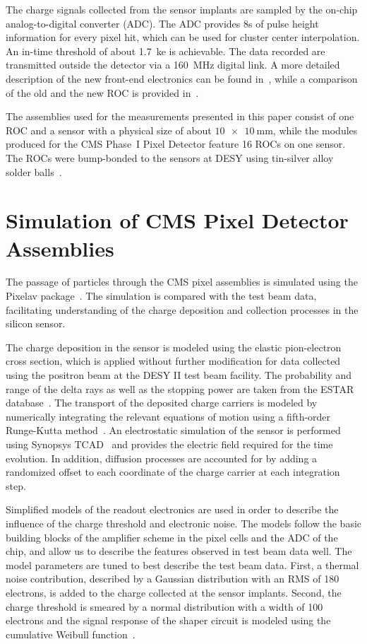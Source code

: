 \documentclass[a4paper,11pt]{article}
\begin{document}
The charge signals collected from the sensor implants are sampled by the on-chip analog-to-digital converter (ADC).
The ADC provides \SI{8}{\bit}s of pulse height information for every pixel hit, which can be used for cluster center interpolation.
An in-time threshold of about \SI{1.7}{ke} is achievable.
The data recorded are transmitted outside the detector via a \SI{160}{\MHz} digital link.
A more detailed description of the new front-end electronics can be found in~\cite{Kästli201388}, while a comparison of the old and the new ROC is provided in~\cite{upgrade-plans}.

The assemblies used for the measurements presented in this paper consist of one ROC and a sensor with a physical size of about $\SI{10 x 10}{\mm}$, while the modules produced for the CMS Phase~I Pixel Detector feature 16 ROCs on one sensor.
The ROCs were bump-bonded to the sensors at DESY using tin-silver alloy solder balls~\cite{panic2014}.


\section{Simulation of CMS Pixel Detector Assemblies}
\label{sec:pixelav}

The passage of particles through the CMS pixel assemblies is simulated using the Pixelav package~\cite{Swartz200388,Swartz:687440}.
The simulation is compared with the test beam data, facilitating understanding of the charge deposition and collection processes in the silicon sensor.

The charge deposition in the sensor is modeled using the elastic pion-electron cross section, which is applied without further modification for data collected using the positron beam at the DESY II test beam facility.
The probability and range of the delta rays as well as the stopping power are taken from the ESTAR database~\cite{estar}.
The transport of the deposited charge carriers is modeled by numerically integrating the relevant equations of motion using a fifth-order Runge-Kutta method~\cite{Swartz:687440}.
An electrostatic simulation of the sensor is performed using Synopsys TCAD~\cite{synopsis-tcad} and provides the electric field required for the time evolution.
In addition, diffusion processes are accounted for by adding a randomized offset to each coordinate of the charge carrier at each integration step.

Simplified models of the readout electronics are used in order to describe the influence of the charge threshold and electronic noise.
The models follow the basic building blocks of the amplifier scheme in the pixel cells and the ADC of the chip, and allow us to describe the features
observed in test beam data well.
The model parameters are tuned to best describe the test beam data.
First, a thermal noise contribution, described by a Gaussian distribution with an RMS of 180 electrons, is added to the charge collected at the sensor implants.
Second, the charge threshold is smeared by a normal distribution with a width of 100 electrons and the signal response of the shaper circuit is modeled using the cumulative Weibull function~\cite{weibull}.
\end{document}
